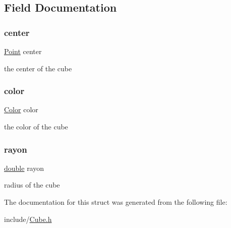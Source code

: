 \subsection{Field Documentation}
\mbox{\label{struct_cube_a24bb1c337bce91dd3e7a4a4372b11793}} 
\subsubsection{\texorpdfstring{center}{center}}
{\footnotesize\ttfamily \hyperlink{struct_point}{Point} center}

the center of the cube \mbox{\label{struct_cube_aa5f4d1eda21c196bd8401ff73f105073}} 
\subsubsection{\texorpdfstring{color}{color}}
{\footnotesize\ttfamily \hyperlink{struct_color}{Color} color}

the color of the cube \mbox{\label{struct_cube_a2459aedac9f8646ad9566164a9a83f41}} 
\subsubsection{\texorpdfstring{rayon}{rayon}}
{\footnotesize\ttfamily \hyperlink{g3x__transfo_8h_a89b2b23e407882a535d835574a7912e1}{double} rayon}

radius of the cube 

The documentation for this struct was generated from the following file\+:\begin{DoxyCompactItemize}
\item 
include/\hyperlink{_cube_8h}{Cube.\+h}\end{DoxyCompactItemize}
